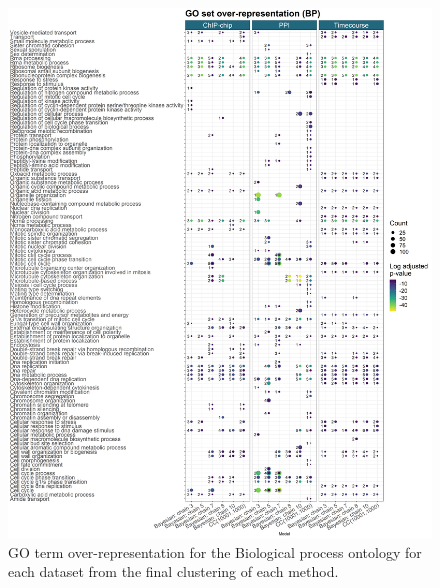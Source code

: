 \documentclass[]{article}
\begin{document}
\begin{figure}
	\centering
	\includegraphics[scale=0.365]{./Images/Yeast/goEnrichmentCompBPvertical.png}
	\caption{GO term over-representation for the Biological process ontology for each dataset from the final clustering of each method.}
	\label{fig:yeastGOBP}
\end{figure}
\end{document}
